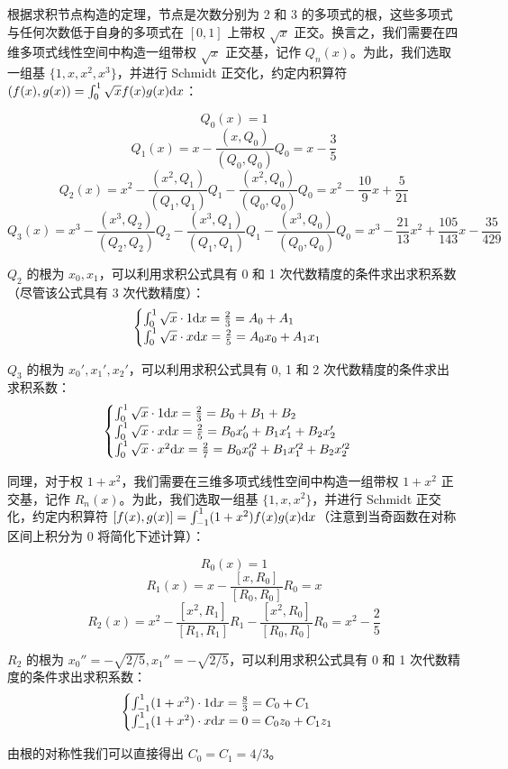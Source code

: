 \documentclass{ctexart}
\begin{document}
根据求积节点构造的定理，节点是次数分别为 2 和 3 的多项式的根，这些多项式与任何次数低于自身的多项式在 $[0,1]$ 上带权 $\sqrt x$ 正交。换言之，我们需要在四维多项式线性空间中构造一组带权 $\sqrt x$ 正交基，记作 $Q_n(x)$。为此，我们选取一组基 $\{1,x,x^2,x^3\}$，并进行 Schmidt 正交化，约定内积算符 $(f(x),g(x))=\int_0^1\sqrt xf(x)g(x)\mathrm{d} x$：

\[
Q_0(x)=1
\]
\[
Q_1(x)=x-\frac{(x,Q_0)}{(Q_0,Q_0)}Q_0=x-\frac35
\]
\[
Q_2(x)=x^2-\frac{(x^2,Q_1)}{(Q_1,Q_1)}Q_1-\frac{(x^2,Q_0)}{(Q_0,Q_0)}Q_0=x^2-\frac{10}9x+\frac5{21}
\]
\[
Q_3(x)=x^3-\frac{(x^3,Q_2)}{(Q_2,Q_2)}Q_2-\frac{(x^3,Q_1)}{(Q_1,Q_1)}Q_1-\frac{(x^3,Q_0)}{(Q_0,Q_0)}Q_0=x^3-\frac{21}{13}x^2+\frac{105}{143}x-\frac{35}{429}
\]

$Q_2$ 的根为 $x_0,x_1$，可以利用求积公式具有 0 和 1 次代数精度的条件求出求积系数（尽管该公式具有 3 次代数精度）：
\[
\begin{cases}
\int_0^1 \sqrt x\cdot 1\mathrm{d} x=\frac23=A_0+A_1\\
\int_0^1 \sqrt x\cdot x\mathrm{d} x=\frac25=A_0x_0+A_1x_1
\end{cases}
\]

$Q_3$ 的根为 $x_0',x_1',x_2'$，可以利用求积公式具有 0, 1 和 2 次代数精度的条件求出求积系数：
\[
\begin{cases}
\int_0^1 \sqrt x\cdot 1\mathrm{d} x=\frac23=B_0+B_1+B_2\\
\int_0^1 \sqrt x\cdot x\mathrm{d} x=\frac25=B_0x_0'+B_1x_1'+B_2x_2'\\
\int_0^1 \sqrt x\cdot x^2\mathrm{d} x=\frac27=B_0x_0'^2+B_1x_1'^2+B_2x_2'^2
\end{cases}
\]

同理，对于权 $1+x^2$，我们需要在三维多项式线性空间中构造一组带权 $1+x^2$ 正交基，记作 $R_n(x)$。为此，我们选取一组基 $\{1,x,x^2\}$，并进行 Schmidt 正交化，约定内积算符 $[f(x),g(x)]=\int_{-1}^1(1+x^2)f(x)g(x)\mathrm{d} x$（注意到当奇函数在对称区间上积分为 0 将简化下述计算）：

\[
R_0(x)=1
\]
\[
R_1(x)=x-\frac{[x,R_0]}{[R_0,R_0]}R_0=x
\]
\[
R_2(x)=x^2-\frac{[x^2,R_1]}{[R_1,R_1]}R_1-\frac{[x^2,R_0]}{[R_0,R_0]}R_0=x^2-\frac25
\]

$R_2$ 的根为 $x_0''=-\sqrt{2/5},x_1''=-\sqrt{2/5}$，可以利用求积公式具有 0 和 1 次代数精度的条件求出求积系数：
\[
\begin{cases}
\int_{-1}^1 (1+x^2)\cdot 1\mathrm{d} x=\frac83=C_0+C_1\\
\int_{-1}^1 (1+x^2)\cdot x\mathrm{d} x=0=C_0z_0+C_1z_1
\end{cases}
\]

由根的对称性我们可以直接得出 $C_0=C_1=4/3$。
\end{document}
